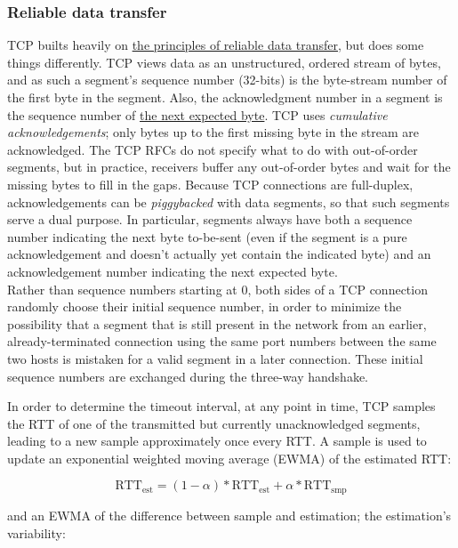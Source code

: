 \documentclass[table, xcdraw]{article}%
\begin{document}
\subsubsection{Reliable data transfer}

TCP builts heavily on \hyperref[reliabledatatransfer]{the principles of reliable data transfer}, but does some things differently. TCP views data as an unstructured, ordered stream of bytes, and as such a segment's sequence number (32-bits) is the byte-stream number of the first byte in the segment. Also, the acknowledgment number in a segment is the sequence number of \underline{the next expected byte}. TCP uses \emph{cumulative acknowledgements}; only  bytes up to the first missing byte in the stream are acknowledged. The TCP RFCs do not specify what to do with out-of-order segments, but in practice, receivers buffer any out-of-order bytes and wait for the missing bytes to fill in the gaps. Because TCP connections are full-duplex, acknowledgements can be \emph{piggybacked} with data segments, so that such segments serve a dual purpose. In particular, segments always have both a sequence number indicating the next byte to-be-sent (even if the segment is a pure acknowledgement and doesn't actually yet contain the indicated byte) and an acknowledgement number indicating the next expected byte.\\
Rather than sequence numbers starting at 0, both sides of a TCP connection randomly choose their initial sequence number, in order to minimize the possibility that a segment that is still present in the network from an earlier, already-terminated connection using the same port numbers between the same two hosts is mistaken for a valid segment in a later connection. These initial sequence numbers are exchanged during the three-way handshake.

In order to determine the timeout interval, at any point in time, TCP samples the RTT of one of the transmitted but currently unacknowledged segments, leading to a new sample approximately once every RTT. A sample is used to update an exponential weighted moving average (EWMA) of the estimated RTT:

\begin{equation}
    \text{RTT}_\text{est} = (1 - \alpha) * \text{RTT}_\text{est} + \alpha * \text{RTT}_\text{smp}
\end{equation}

and an EWMA of the difference between sample and estimation; the estimation's variability:
\end{document}
